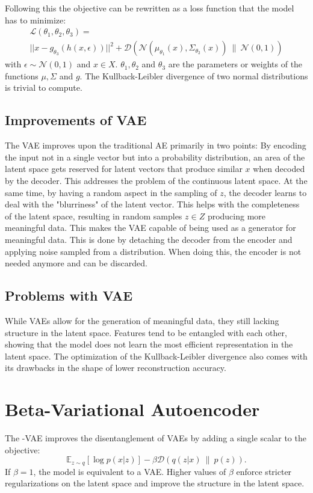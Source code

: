\documentclass[a4paper]{IEEEtran}
\begin{document}
Following this the objective can be rewritten as a loss function that the model has to minimize:
\begin{gather}
	\mathcal{L}(\theta_1, \theta_2, \theta_3) = \\ 
	||x - g_{\theta_3}(h(x, \epsilon))||^2 + \mathcal{D}(\mathcal{N}(\mu_{\theta_1}(x), \Sigma_{\theta_2}(x)) \ \| \ \mathcal{N}(0, 1))
	\label{vae_loss}
\end{gather}
with $\epsilon \sim \mathcal{N}(0,1)$ and $x \in X$. $\theta_1, \theta_2$ and $\theta_3$ are the parameters or weights of the functions $\mu, \Sigma$ and $g$. The Kullback-Leibler divergence of two normal distributions is trivial to compute.

\subsection{Improvements of VAE}
The VAE improves upon the traditional AE primarily in two points:
By encoding the input not in a single vector but into a probability distribution, an area of the latent space gets reserved for latent vectors that produce similar $x$ when decoded by the decoder. This addresses the problem of the continuous latent space. At the same time, by having a random aspect in the sampling of $z$, the decoder learns to deal with the "blurriness" of the latent vector. This helps with the completeness of the latent space, resulting in random samples $z \in Z$ producing more meaningful data. This makes the VAE capable of being used as a generator for meaningful data. This is done by detaching the decoder from the encoder and applying noise sampled from a distribution. When doing this, the encoder is not needed anymore and can be discarded.

\subsection{Problems with VAE}
While VAEs allow for the generation of meaningful data, they still lacking structure in the latent space. Features tend to be entangled with each other, showing that the model does not learn the most efficient representation in the latent space. The optimization of the Kullback-Leibler divergence also comes with its drawbacks in the shape of lower reconstruction accuracy. 

\section{Beta-Variational Autoencoder}
The \textbeta -VAE improves the disentanglement of VAEs by adding a single scalar to the objective:
\begin{equation}
	\mathbb{E}_{z \sim q}\left[ \log p(x|z) \right] - \beta \mathcal{D}(q(z|x) \ \| \ p(z)).
\end{equation}
If $\beta = 1$, the model is equivalent to a VAE. Higher values of $\beta$ enforce stricter regularizations on the latent space and improve the structure in the latent space. 
\end{document}
